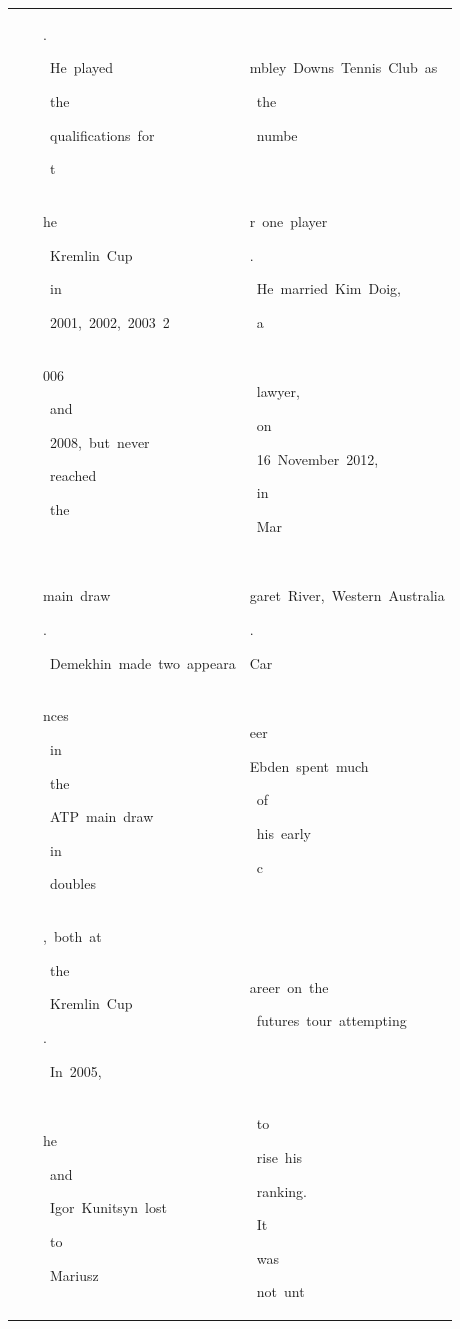 \begin{table}[h]
\begin{tabular}{ l | l | l | l }
  &  & \colorbox{cm_12!40}{\strut .}\colorbox{cm_0!40}{\strut \ He\ played}\colorbox{cm_12!40}{\strut \ the}\colorbox{cm_0!40}{\strut \ qualifications\ for}\colorbox{cm_12!40}{\strut \ t} & \colorbox{cm_0!40}{\strut mbley\ Downs\ Tennis\ Club\ as}\colorbox{cm_12!40}{\strut \ the}\colorbox{cm_0!40}{\strut \ numbe} \\ 
  &  & \colorbox{cm_12!40}{\strut he}\colorbox{cm_0!40}{\strut \ Kremlin\ Cup}\colorbox{cm_12!40}{\strut \ in}\colorbox{cm_0!40}{\strut \ 2001,\ 2002,\ 2003\ 2} & \colorbox{cm_0!40}{\strut r\ one\ player}\colorbox{cm_12!40}{\strut .}\colorbox{cm_0!40}{\strut \ He\ married\ Kim\ Doig,}\colorbox{cm_12!40}{\strut \ a} \\ 
  &  & \colorbox{cm_0!40}{\strut 006}\colorbox{cm_12!40}{\strut \ and}\colorbox{cm_0!40}{\strut \ 2008,\ but\ never}\colorbox{cm_12!40}{\strut \ reached}\colorbox{cm_25!40}{\strut \ the}\colorbox{cm_0!40}{\strut \ } & \colorbox{cm_0!40}{\strut \ lawyer,}\colorbox{cm_12!40}{\strut \ on}\colorbox{cm_0!40}{\strut \ 16\ November\ 2012,}\colorbox{cm_12!40}{\strut \ in}\colorbox{cm_0!40}{\strut \ Mar} \\ 
  &  & \colorbox{cm_0!40}{\strut main\ draw}\colorbox{cm_12!40}{\strut .}\colorbox{cm_0!40}{\strut \ Demekhin\ made\ two\ appeara} & \colorbox{cm_0!40}{\strut garet\ River,\ Western\ Australia}\colorbox{cm_12!40}{\strut .}\colorbox{cm_25!40}{\strut }\colorbox{cm_38!40}{\strut }\colorbox{cm_0!40}{\strut Car} \\ 
  &  & \colorbox{cm_0!40}{\strut nces}\colorbox{cm_12!40}{\strut \ in}\colorbox{cm_25!40}{\strut \ the}\colorbox{cm_0!40}{\strut \ ATP\ main\ draw}\colorbox{cm_12!40}{\strut \ in}\colorbox{cm_0!40}{\strut \ doubles} & \colorbox{cm_0!40}{\strut eer}\colorbox{cm_12!40}{\strut }\colorbox{cm_25!40}{\strut }\colorbox{cm_0!40}{\strut Ebden\ spent\ much}\colorbox{cm_12!40}{\strut \ of}\colorbox{cm_0!40}{\strut \ his\ early}\colorbox{cm_12!40}{\strut \ c} \\ 
  &  & \colorbox{cm_0!40}{\strut ,\ both\ at}\colorbox{cm_12!40}{\strut \ the}\colorbox{cm_0!40}{\strut \ Kremlin\ Cup}\colorbox{cm_12!40}{\strut .}\colorbox{cm_0!40}{\strut \ In\ 2005,\ } & \colorbox{cm_12!40}{\strut areer\ on\ the}\colorbox{cm_0!40}{\strut \ futures\ tour\ attempting} \\ 
  &  & \colorbox{cm_0!40}{\strut he}\colorbox{cm_12!40}{\strut \ and}\colorbox{cm_0!40}{\strut \ Igor\ Kunitsyn\ lost}\colorbox{cm_12!40}{\strut \ to}\colorbox{cm_0!40}{\strut \ Mariusz} & \colorbox{cm_12!40}{\strut \ to}\colorbox{cm_0!40}{\strut \ rise\ his}\colorbox{cm_12!40}{\strut \ ranking.}\colorbox{cm_0!40}{\strut \ It}\colorbox{cm_12!40}{\strut \ was}\colorbox{cm_0!40}{\strut \ not\ unt} \\ 

\end{tabular}
\end{table}
